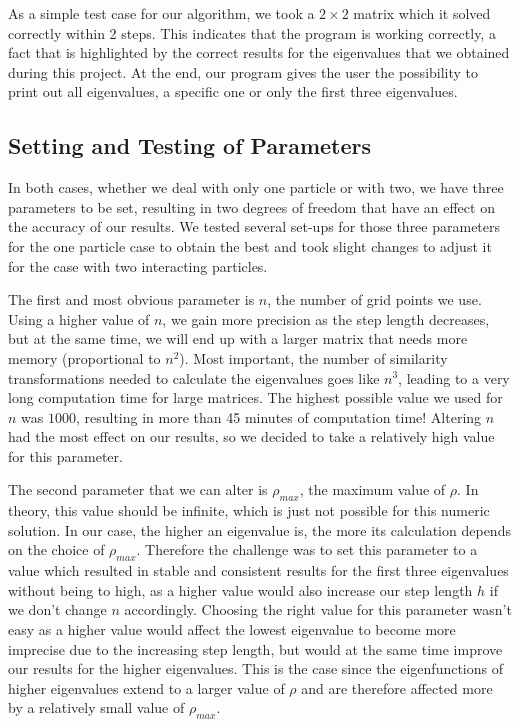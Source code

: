 \documentclass[10pt,a4paper]{article}
\begin{document}
As a simple test case for our algorithm, we took a $2\times2$ matrix which it solved correctly within 2 steps. This indicates that the program is working correctly, a fact that is highlighted by the correct results for the eigenvalues that we obtained during this project.
At the end, our program gives the user the possibility to print out all eigenvalues, a specific one or only the first three eigenvalues.
\subsection{Setting and Testing of Parameters}

In both cases, whether we deal with only one particle or with two, we have three parameters to be set, resulting in two degrees of freedom that have an effect on the accuracy of our results. We tested several set-ups for those three parameters for the one particle case to obtain the best and took slight changes to adjust it for the case with two interacting particles.

The first and most obvious parameter is $n$, the number of grid points we use. Using a higher value of $n$, we gain more precision as the step length decreases, but at the same time, we will end up with a larger matrix that needs more memory (proportional to $n^2$). Most important, the number of similarity transformations needed to calculate the eigenvalues goes like $n^3$, leading to a very long computation time for large matrices. The highest possible value we used for $n$ was $1000$, resulting in more than 45 minutes of computation time! Altering $n$ had the most effect on our results, so we decided to take a relatively high value for this parameter.

The second parameter that we can alter is $\rho_{max}$, the maximum value of $\rho$. In theory, this value should be infinite, which is just not possible for this numeric solution. In our case, the higher an eigenvalue is, the more its calculation depends on the choice of $\rho_{max}$. Therefore the challenge was to set this parameter to a value which resulted in stable and consistent results for the first three eigenvalues without being to high, as a higher value would also increase our step length $h$ if we don't change $n$ accordingly. Choosing the right value for this parameter wasn't easy as a higher value would affect the lowest eigenvalue to become more imprecise due to the increasing step length, but would at the same time improve our results for the higher eigenvalues. This is the case since the eigenfunctions of higher eigenvalues extend to a larger value of $\rho$ and are therefore affected more by a relatively small value of $\rho_{max}$.
\end{document}
